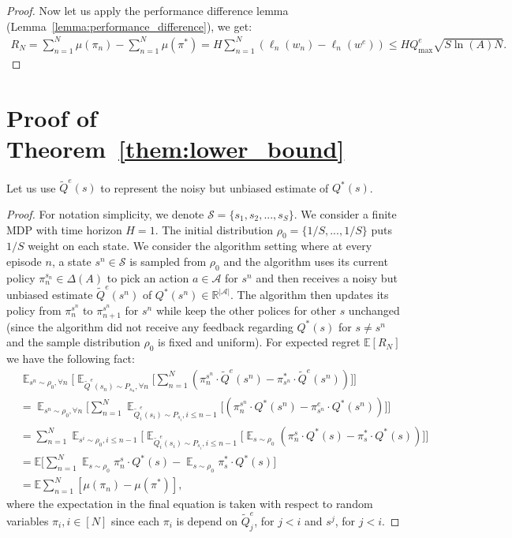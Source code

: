 \documentclass{article}
\begin{document}
\begin{proof}
Now let us apply the performance difference lemma (Lemma~\ref{lemma:performance_difference}), we get:
\begin{align}
R_N = \sum_{n=1}^N\mu(\pi_n) - \sum_{n=1}^N\mu(\pi^*) = H\sum_{n=1}^N (\ell_n(w_n) - \ell_n(w^e)) \leq HQ_{\max}^e\sqrt{S\ln(A)N}.
\end{align}

\end{proof}


\section{Proof of Theorem~\ref{them:lower_bound}}
\label{sec:proof_lower_bound}
Let us use $\tilde{Q}^e(s)$ to represent the noisy but unbiased estimate of $Q^*(s)$.
\begin{proof}
For notation simplicity, we denote $\mathcal{S} = \{s_1, s_2, ..., s_S\}$. We consider a finite MDP with time horizon $H = 1$. The initial distribution $\rho_0 = \{1/S, ..., 1/S\}$ puts $1/S$ weight on each state. 
We consider the algorithm setting where at every episode $n$, a state $s^n\in \mathcal{S}$ is sampled from $\rho_0$ and the algorithm uses its current policy $\pi_{n}^{s_n}\in\Delta({A})$ to pick an action $a\in\mathcal{A}$ for $s^n$ and then receives a noisy but unbiased estimate $\tilde{Q}^e(s^n)$ of $Q^*(s^n)\in\mathbb{R}^{|\mathcal{A}|}$. The algorithm then updates its policy from $\pi_{n}^{s^n}$ to $\pi_{n+1}^{s^n}$ for $s^n$ while keep the other polices for other $s$ unchanged (since the algorithm did not receive any feedback regarding $Q^*(s)$ for $s\neq s^{n}$ and the sample distribution $\rho_0$ is fixed and uniform). For expected regret $\mathbb{E}[R_N]$ we have the following fact:
\begin{align}
\label{eq:relation}
&\mathop{\mathbb{E}}_{s^n\sim\rho_0,\forall n}\Big[\mathop{\mathbb{E}}_{\tilde{Q}^e(s_n)\sim P_{s_n},\forall n}\big[\sum_{n=1}^N( \pi_n^{s^n}\cdot \tilde{Q}^e(s^n) - \pi^*_{s^n}\cdot \tilde{Q}^e(s^n))\big]\Big] \nonumber\\
&= \mathop{\mathbb{E}}_{s^n\sim \rho_0,\forall n}\Big[\sum_{n=1}^N\mathop{\mathbb{E}}_{\tilde{Q}^e_i(s_i)\sim P_{s_i},i\leq n-1}\big[ (\pi_n^{s^n}\cdot Q^*(s^n) - \pi_{s^n}^e\cdot Q^*(s^n))\big]\Big] \nonumber\\
& = \sum_{n=1}^N\mathop{\mathbb{E}}_{s^i\sim \rho_0,i\leq n-1}\Big[\mathop{\mathbb{E}}_{\tilde{Q}^e_i(s_i)\sim P_{s_i},i\leq n-1}\big[ \mathop{\mathbb{E}}_{s\sim\rho_0}(\pi_n^{s}\cdot Q^*(s) - \pi_{s}^*\cdot Q^*(s))\big]\Big] \nonumber\\
&= \mathbb{E}\big[\sum_{n=1}^N\mathop{\mathbb{E}}_{s\sim\rho_0}\pi_n^s\cdot Q^*(s) - \mathop{\mathbb{E}}_{s\sim \rho_0}\pi_s^*\cdot Q^*(s)\big] \nonumber\\
& = \mathbb{E}\sum_{n=1}^N [\mu(\pi_n) - \mu(\pi^*)],
\end{align}where the expectation in the final equation is taken with respect to random variables $\pi_i,i\in[N]$ since each $\pi_i$ is depend on $\tilde{Q}^e_j$, for $j< i$ and $s^j$, for $j<i$.  


\end{proof}
\end{document}
